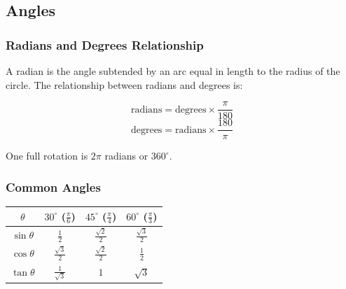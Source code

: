 \subsection{Angles}

\subsubsection{Radians and Degrees Relationship}

A radian is the angle subtended by an arc equal in length to the radius of the circle. The relationship between radians and degrees is:

\[
    \text{radians} = \text{degrees} \times \frac{\pi}{180}
\]
\[
    \text{degrees} = \text{radians} \times \frac{180}{\pi}
\]

One full rotation is $2\pi$ radians or $360^\circ$.

\subsubsection{Common Angles}

\begin{table}[H]
    \begin{center}
        \begin{tabular}[c]{|c|c|c|c|}
            \hline
            $\theta$ & $30^\circ$ ($\frac{\pi}{6}$) & $45^\circ$ ($\frac{\pi}{4}$) & $60^\circ$ ($\frac{\pi}{3}$) \\
            \hline
            $\sin\theta$ & $\frac{1}{2}$ & $\frac{\sqrt{2}}{2}$ & $\frac{\sqrt{3}}{2}$ \\
            \hline
            $\cos\theta$ & $\frac{\sqrt{3}}{2}$ & $\frac{\sqrt{2}}{2}$ & $\frac{1}{2}$ \\
            \hline
            $\tan\theta$ & $\frac{1}{\sqrt{3}}$ & $1$ & $\sqrt{3}$ \\
            \hline
        \end{tabular}
    \end{center}
\end{table}

